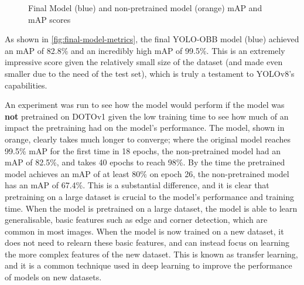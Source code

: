 \begin{figure}[H]
  \centering
  \begin{minipage}[t]{0.8\textwidth}
    \centering
    
  \end{minipage}
  \par\medskip
  \begin{minipage}[t]{0.8\textwidth}
    \centering
    
  \end{minipage}
  \caption{Final Model (blue) and non-pretrained model (orange) mAP and mAP scores}
  \label{fig:final-model-metrics}
\end{figure}

As shown in \autoref{fig:final-model-metrics}, the final YOLO-OBB model (blue) achieved an mAP of 82.8\% and an incredibly high mAP of 99.5\%. This is an extremely impressive score given the relatively small size of the dataset (and made even smaller due to the need of the test set), which is truly a testament to YOLOv8's capabilities.

An experiment was run to see how the model would perform if the model was \textbf{not} pretrained on DOTOv1 \cite{9560031} given the low training time to see how much of an impact the pretraining had on the model's performance. The model, shown in orange, clearly takes much longer to converge; where the original model reaches 99.5\% mAP for the first time in 18 epochs, the non-pretrained model had an mAP of 82.5\%, and takes 40 epochs to reach 98\%. By the time the pretrained model achieves an mAP of at least 80\% on epoch 26, the non-pretrained model has an mAP of 67.4\%. This is a substantial difference, and it is clear that pretraining on a large dataset is crucial to the model's performance and training time. When the model is pretrained on a large dataset, the model is able to learn generalisable, basic features such as edge and corner detection, which are common in most images. When the model is now trained on a new dataset, it does not need to relearn these basic features, and can instead focus on learning the more complex features of the new dataset. This is known as transfer learning, and it is a common technique used in deep learning to improve the performance of models on new datasets.


